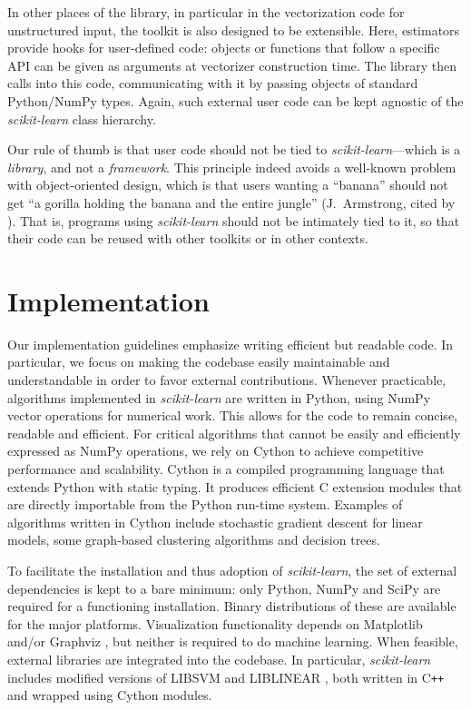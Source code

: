 \documentclass{llncs}
\newcommand{\sklearn}{\textit{scikit-learn}\xspace}
\begin{document}
In other places of the library, in particular in the vectorization code
for unstructured input, the toolkit is also designed to be
extensible. Here, estimators provide hooks for user-defined code: objects or
functions that follow a specific API can be given as arguments at vectorizer
construction time. The library then calls into this code, communicating with it by passing objects of standard Python/NumPy types.
Again, such external user code can be kept agnostic of the \sklearn
class hierarchy.

Our rule of thumb is that user code should not be tied to \sklearn---which is a
\textit{library}, and not a \textit{framework}. This principle indeed avoids a
well-known problem with object-oriented design, which is that users wanting a
``banana'' should not get ``a gorilla holding the banana and the entire jungle''
(J.~Armstrong, cited by \citealp[p.~213]{seibel2009coders}).
That is, programs using \sklearn should not be intimately tied to it,
so that their code can be reused with other toolkits or in other contexts.


\section{Implementation}
\label{sec:implementation}

Our implementation guidelines emphasize writing efficient but readable code.
In particular, we focus on making the codebase easily maintainable and
understandable in order to favor external contributions. Whenever practicable,
algorithms implemented in \sklearn are written in Python,
using NumPy vector operations for numerical work.
This allows for the code to remain concise, readable and
efficient. For critical algorithms that cannot be easily and efficiently
expressed as NumPy operations, we rely on Cython \citep{behnel2011cython}
to achieve competitive performance and scalability. Cython is a
compiled programming language that extends Python with static typing. It
produces efficient C extension modules that are directly importable from the
Python run-time system. Examples of algorithms written in Cython include
stochastic gradient descent for linear models, some graph-based clustering
algorithms and decision trees.

To facilitate the installation and thus adoption of \sklearn,
the set of external dependencies is kept to a bare minimum:
only Python, NumPy and SciPy are required for a functioning installation.
Binary distributions of these are available for the major platforms.
Visualization functionality depends on Matplotlib \citep{hunter2007matplotlib}
and/or Graphviz \citep{gansner2000},
but neither is required to do machine learning.
When feasible, external libraries are integrated into the codebase.
In particular, \sklearn includes modified versions of \textsf{LIBSVM} and \textsf{LIBLINEAR}
\citep{chang2011libsvm,fan2008}, both written in C{}\verb!++!
and wrapped using Cython modules.
\end{document}
